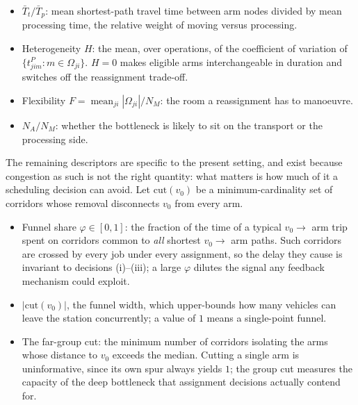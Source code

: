 \documentclass[manuscript,screen,review]{acmart}
\begin{document}
\begin{itemize}[leftmargin=*,topsep=2pt,itemsep=1pt]
\item $\bar{T}_t/\bar{T}_p$: mean shortest-path travel time between arm nodes
divided by mean processing time, the relative weight of moving versus
processing.
\item Heterogeneity $H$: the mean, over operations, of the coefficient of
variation of $\{t^P_{jim}: m\in\Omega_{ji}\}$. $H=0$ makes eligible arms
interchangeable in duration and switches off the reassignment trade-off.
\item Flexibility $F=\operatorname{mean}_{ji}|\Omega_{ji}|/N_M$: the room a
reassignment has to manoeuvre.
\item $N_A/N_M$: whether the bottleneck is likely to sit on the transport or
the processing side.
\end{itemize}

The remaining descriptors are specific to the present setting, and exist because
congestion as such is not the right quantity: what matters is how much of it a
scheduling decision can avoid. Let $\mathrm{cut}(v_0)$ be a minimum-cardinality
set of corridors whose removal disconnects $v_0$ from every arm.

\begin{itemize}[leftmargin=*,topsep=2pt,itemsep=1pt]
\item Funnel share $\varphi\in[0,1]$: the fraction of the time of a typical
$v_0\to$ arm trip spent on corridors common to \emph{all} shortest $v_0\to$ arm
paths. Such corridors are crossed by every job under every assignment, so the
delay they cause is invariant to decisions (i)--(iii); a large $\varphi$ dilutes
the signal any feedback mechanism could exploit.
\item $|\mathrm{cut}(v_0)|$, the funnel width, which upper-bounds how many
vehicles can leave the station concurrently; a value of $1$ means a single-point
funnel.
\item The far-group cut: the minimum number of corridors isolating the arms
whose distance to $v_0$ exceeds the median. Cutting a single arm is
uninformative, since its own spur always yields $1$; the group cut measures the
capacity of the deep bottleneck that assignment decisions actually contend for.
\end{itemize}
\end{document}
